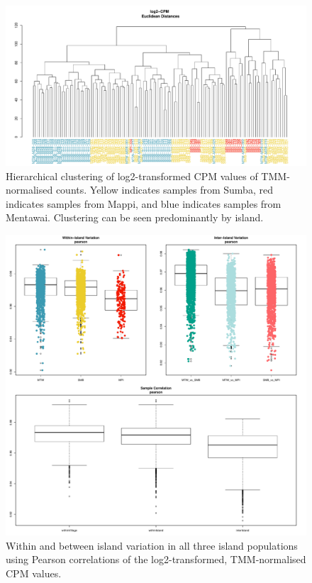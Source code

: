 \documentclass[12pt,a4paper,titlepage,twoside,openright]{book}
\begin{document}
\begin{mainmatter}
{{\begin{figure}[htb!]
\centering
\includegraphics[width=\textwidth,height=\textheight,keepaspectratio]{Figures/SampleDistances_Euclidean.pdf}
\caption{Hierarchical clustering of log2-transformed CPM values of TMM- normalised counts. Yellow indicates samples from Sumba, red indicates samples from Mappi, and blue indicates samples from Mentawai. Clustering can be seen predominantly by island.}
\label{fig:Euclidean Sample Distances}
\end{figure}

\begin{figure}[htb!]
\centering
\includegraphics[width=\textwidth,height=\textheight,keepaspectratio]{Figures/IslandVariation_pearson.pdf}
\caption{Within and between island variation in all three island populations using Pearson correlations of the log2-transformed, TMM-normalised CPM values.}
\label{fig:Island Variation}
\end{figure}

}}
\end{mainmatter}
\end{document}
